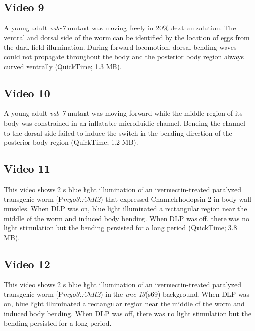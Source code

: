 \subsection{Video 9}\label{video:prop9}
 
A young adult \textit{vab-7} mutant was moving freely in 20\% dextran solution. The ventral and dorsal 
side of the worm can be identified by the location of eggs from the dark field illumination. 
During forward locomotion, dorsal bending waves could not propagate throughout the body and the 
posterior body region always curved ventrally (QuickTime; 1.3 MB). 
 
\subsection{Video 10} \label{video:prop10}
 
A young adult \textit{vab-7} mutant was moving forward while the middle region of its body was 
constrained in an inflatable microfluidic channel. Bending the channel to the dorsal side failed to 
induce the switch in the bending direction of the posterior body region (QuickTime; 1.2 MB). 
 
\subsection{Video 11}\label{video:prop11}
 
This video shows 2 s blue light illumination of an ivermectin-treated paralyzed 
transgenic worm (P\textit{myo3::ChR2}) that expressed Channelrhodopsin-2 in body wall muscles. 
When DLP was on, blue light illuminated a rectangular region near the middle of the worm and 
induced body bending. When DLP was off, there was no light stimulation but the bending 
persisted for a long period (QuickTime; 3.8 MB). 
 
 

\subsection{Video 12}\label{video:prop12}
 
This video shows 2 s blue light illumination of an ivermectin-treated paralyzed 
transgenic worm (P\textit{myo3::ChR2}) in the \textit{unc-13}(s69) background. When DLP was on, blue light 
illuminated a rectangular region near the middle of the worm and induced body bending. When 
DLP was off, there was no light stimulation but the bending persisted for a long period. 


